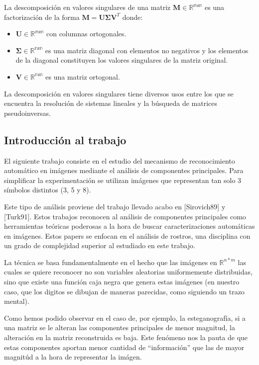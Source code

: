 La descomposici\'on en valores singulares de una matriz $\mathbf{M} \in \mathbb{R^{mxn}}$ es una factorizaci\'on de la forma $\mathbf{M} =
\mathbf{U} \boldsymbol{\Sigma} \mathbf{V}^T$ donde:

\begin{itemize}
  \item $\mathbf{U} \in \mathbb{R^{mxn}}$ con columnas ortogonales.
  \item $\boldsymbol{\Sigma} \in \mathbb{R^{nxn}}$ es una matriz diagonal con elementos no negativos y los elementos de la
diagonal constituyen los valores singulares de la matriz original.
  \item $\mathbf{V} \in \mathbb{R^{nxn}}$ es una matriz ortogonal.
\end{itemize}

La descomposici\'on en valores singulares tiene diversos usos entre los que se encuentra la resoluci\'on de
sistemas lineales y la b\'usqueda de matrices pseudoinversas.

\subsection{Introducci\'on al trabajo}

El siguiente trabajo consiste en el estudio del mecanismo de reconocimiento autom\'atico
en im\'agenes mediante el an\'alisis de componentes principales. Para simplificar la
experimentaci\'on se utilizan im\'agenes que representan tan solo 3 s\'imbolos distintos
(3, 5 y 8).

Este tipo de an\'alisis proviene del trabajo llevado acabo en [Sirovich89] y [Turk91]. Estos
trabajos reconocen al an\'alisis de componentes principales como herramientas te\'oricas poderosas
a la hora de buscar caracterizaciones autom\'aticas en im\'agenes. Estos papers se enfocan en el
an\'alisis de rostros, una disciplina con un grado de complejidad superior al estudiado en este
trabajo.

La t\'ecnica se basa fundamentalmente en el hecho que las im\'agenes en $\mathbb{R}^{n * m}$ las cuales se
quiere reconocer no son variables aleatorias uniformemente distribuidas, sino que existe una funci\'on caja
negra que genera estas im\'agenes (en nuestro caso, que los digitos se dibujan de maneras parecidas,
como siguiendo un trazo mental).

Como hemos podido observar en el caso de, por ejemplo, la esteganograf\'ia, si a una matriz se le alteran
las componentes principales de menor magnitud, la alteraci\'on en la matriz reconstruida es baja.
Este fen\'omeno nos la pauta de que estas componentes aportan menor cantidad de ``informaci\'on''
que las de mayor magnit\'ud a la hora de representar la im\'agen.


